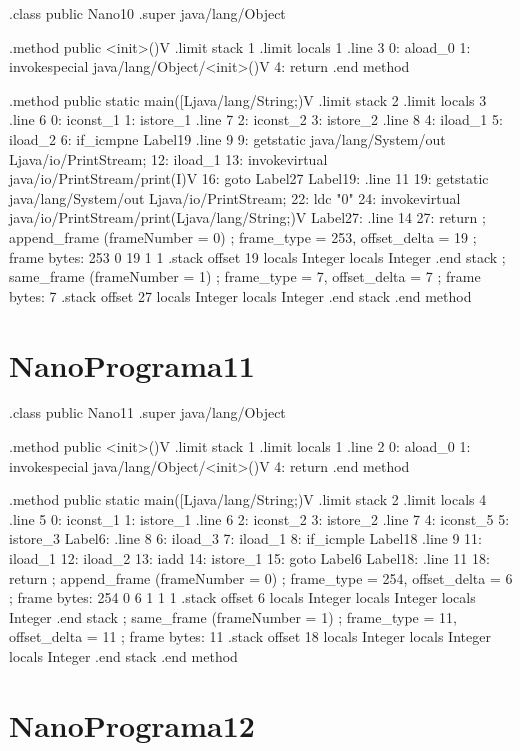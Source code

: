 \documentclass[12pt,a4paper,twoside]{report}
\begin{document}
\begin{terminal}
.class public Nano10
.super java/lang/Object

.method public <init>()V
  .limit stack 1
  .limit locals 1
  .line 3
  0: aload_0
  1: invokespecial java/lang/Object/<init>()V
  4: return
.end method

.method public static main([Ljava/lang/String;)V
  .limit stack 2
  .limit locals 3
  .line 6
  0: iconst_1
  1: istore_1
  .line 7
  2: iconst_2
  3: istore_2
  .line 8
  4: iload_1
  5: iload_2
  6: if_icmpne Label19
  .line 9
  9: getstatic java/lang/System/out Ljava/io/PrintStream;
  12: iload_1
  13: invokevirtual java/io/PrintStream/print(I)V
  16: goto Label27
Label19:
  .line 11
  19: getstatic java/lang/System/out Ljava/io/PrintStream;
  22: ldc "0"
  24: invokevirtual java/io/PrintStream/print(Ljava/lang/String;)V
Label27:
  .line 14
  27: return
  ; append_frame (frameNumber = 0)
  ; frame_type = 253, offset_delta = 19
  ; frame bytes: 253 0 19 1 1
  .stack
    offset 19
    locals Integer
    locals Integer
    .end stack
  ; same_frame (frameNumber = 1)
  ; frame_type = 7, offset_delta = 7
  ; frame bytes: 7
  .stack
    offset 27
    locals Integer
    locals Integer
    .end stack
.end method
\end{terminal}\section{NanoPrograma11}
\begin{terminal}
.class public Nano11
.super java/lang/Object

.method public <init>()V
  .limit stack 1
  .limit locals 1
  .line 2
  0: aload_0
  1: invokespecial java/lang/Object/<init>()V
  4: return
.end method

.method public static main([Ljava/lang/String;)V
  .limit stack 2
  .limit locals 4
  .line 5
  0: iconst_1
  1: istore_1
  .line 6
  2: iconst_2
  3: istore_2
  .line 7
  4: iconst_5
  5: istore_3
Label6:
  .line 8
  6: iload_3
  7: iload_1
  8: if_icmple Label18
  .line 9
  11: iload_1
  12: iload_2
  13: iadd
  14: istore_1
  15: goto Label6
Label18:
  .line 11
  18: return
  ; append_frame (frameNumber = 0)
  ; frame_type = 254, offset_delta = 6
  ; frame bytes: 254 0 6 1 1 1
  .stack
    offset 6
    locals Integer
    locals Integer
    locals Integer
    .end stack
  ; same_frame (frameNumber = 1)
  ; frame_type = 11, offset_delta = 11
  ; frame bytes: 11
  .stack
    offset 18
    locals Integer
    locals Integer
    locals Integer
    .end stack
.end method
\end{terminal}\section{NanoPrograma12}
\end{document}
